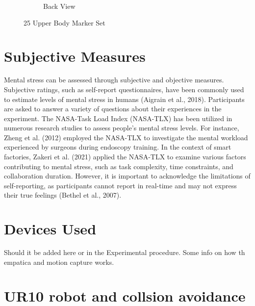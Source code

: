 \begin{figure}[h]
\begin{subfigure}[b]{0.45\columnwidth}
        \caption{Back View }
        \label{fig:phone2}
    \end{subfigure}
    \caption{25 Upper Body Marker Set}
    \label{fig:phone}
\end{figure}

\section{Subjective Measures}
Mental stress can be assessed through subjective and objective
measures. Subjective ratings, such as self-report questionnaires, have
been commonly used to estimate levels of mental stress in humans
(Aigrain et al., 2018). Participants are asked to answer a variety of
questions about their experiences in the experiment. The NASA-Task
Load Index (NASA-TLX) has been utilized in numerous research
studies to assess people’s mental stress levels. For instance, Zheng et al.
(2012) employed the NASA-TLX to investigate the mental workload
experienced by surgeons during endoscopy training. In the context of
smart factories, Zakeri et al. (2021) applied the NASA-TLX to examine
various factors contributing to mental stress, such as task complexity,
time constraints, and collaboration duration. However, it is important to
acknowledge the limitations of self-reporting, as participants cannot
report in real-time and may not express their true feelings (Bethel et al.,
2007). 

\section{Devices Used}
Should it be added here or in the Experimental procedure. Some info on how th empatica and motion capture works.
\section{UR10 robot and collsion avoidance }


